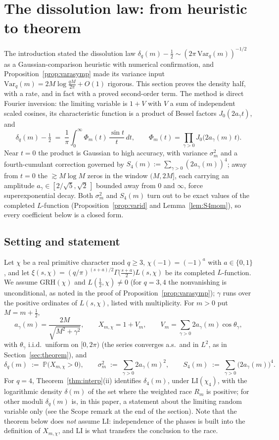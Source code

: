 \section{The dissolution law: from heuristic to theorem}
\label{sec:dissolution}

The introduction stated the dissolution law
$\delta_q(m)-\tfrac12\sim(2\pi\,\mathrm{Var}_q(m))^{-1/2}$ as a
Gaussian-comparison heuristic with numerical confirmation, and
Proposition~\ref{prop:varasymp} made its variance input
$\mathrm{Var}_q(m)=2M\log\tfrac{qM}{2\pi}+O(1)$ rigorous. This section
proves the density half, with a rate, and in fact with a proved
second-order term. The method is direct Fourier inversion: the limiting
variable is $1+V$ with $V$ a sum of independent scaled cosines, its
characteristic function is a product of Bessel factors
$J_0(2a_\gamma t)$, and
\[
\delta_q(m)-\tfrac12\;=\;\frac1\pi\int_0^\infty
\Phi_m(t)\,\frac{\sin t}{t}\,dt,
\qquad
\Phi_m(t)=\prod_{\gamma>0}J_0\bigl(2a_\gamma(m)\,t\bigr).
\]
Near $t=0$ the product is Gaussian to high accuracy, with variance
$\sigma_m^2$ and a fourth-cumulant correction governed by
$S_4(m):=\sum_{\gamma>0}(2a_\gamma(m))^4$; away from $t=0$ the
$\gtrsim M\log M$ zeros in the window $(M,2M]$, each carrying an
amplitude $a_\gamma\in[2/\sqrt5,\sqrt2\,]$ bounded away from $0$ and
$\infty$, force superexponential decay. Both $\sigma_m^2$ and $S_4(m)$
turn out to be exact values of the completed $L$-function
(Proposition~\ref{prop:varid} and Lemma~\ref{lem:S4mom}), so every
coefficient below is a closed form.

\subsection*{Setting and statement}

Let $\chi$ be a real primitive character mod $q\ge3$,
$\chi(-1)=(-1)^a$ with $a\in\{0,1\}$, and let
$\xi(s,\chi)=(q/\pi)^{(s+a)/2}\Gamma\bigl(\tfrac{s+a}2\bigr)L(s,\chi)$
be its completed $L$-function. We assume GRH$(\chi)$ and
$L(\tfrac12,\chi)\ne0$ (for $q=3,4$ the nonvanishing is unconditional,
as noted in the proof of Proposition~\ref{prop:varasymp}); $\gamma$
runs over the positive ordinates of $L(s,\chi)$, listed with
multiplicity. For $m>0$ put $M=m+\tfrac12$,
\[
a_\gamma(m)=\frac{2M}{\sqrt{M^2+\gamma^2}},\qquad
X_{m,\chi}=1+V_m,\qquad
V_m=\sum_{\gamma>0}2a_\gamma(m)\cos\theta_\gamma,
\]
with $\theta_\gamma$ i.i.d.\ uniform on $[0,2\pi)$ (the series
converges a.s.\ and in $L^2$, as in Section~\ref{sec:theorem}), and
\[
\delta_q(m)\;:=\;\mathbb P\bigl(X_{m,\chi}>0\bigr),
\qquad
\sigma_m^2\;:=\;\sum_{\gamma>0}2a_\gamma(m)^2,
\qquad
S_4(m)\;:=\;\sum_{\gamma>0}\bigl(2a_\gamma(m)\bigr)^4 .
\]
For $q=4$, Theorem~\ref{thm:interp}(ii) identifies $\delta_4(m)$, under
LI$(\chi_4)$, with the logarithmic density $\delta(m)$ of the set where
the weighted race $R_m$ is positive; for other moduli $\delta_q(m)$ is,
in this paper, a statement about the limiting random variable only (see
the Scope remark at the end of the section). Note that the theorem
below does \emph{not} assume LI: independence of the phases is built
into the definition of $X_{m,\chi}$, and LI is what transfers the
conclusion to the race.

